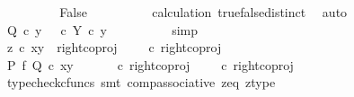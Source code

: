 \begin{isabellebody}
\ \ \ \ \ \ \isamarkupfalse%
\ \isamarkupfalse%
\ False\isanewline
\ \ \ \ \ \ \ \ \isamarkupfalse%
\ calculation\ true{\isacharunderscore}{\kern0pt}false{\isacharunderscore}{\kern0pt}distinct\ \isamarkupfalse%
\ auto\isanewline
\ \ \ \ \ \ \isamarkupfalse%
\ \isamarkupfalse%
\ {\isachardoublequoteopen}Q\ {\isasymcirc}\isactrlsub c\ y\ {\isacharequal}{\kern0pt}\ {\isacharparenleft}{\kern0pt}{\isasymt}\ {\isasymcirc}\isactrlsub c\ {\isasymbeta}\isactrlbsub Y\isactrlesub {\isacharparenright}{\kern0pt}\ {\isasymcirc}\isactrlsub c\ y{\isachardoublequoteclose}\isanewline
\ \ \ \ \ \ \ \ \isamarkupfalse%
\ simp\isanewline
\ \ \ \ \isamarkupfalse%
\isanewline
\ \ \ \ \ \ \isamarkupfalse%
\ {\isachardoublequoteopen}z\ {\isasymcirc}\isactrlsub c\ {\isasymlangle}x{\isacharcomma}{\kern0pt}y{\isasymrangle}\ {\isacharequal}{\kern0pt}\ right{\isacharunderscore}{\kern0pt}coproj\ {\isasymone}\ {\isacharparenleft}{\kern0pt}{\isasymone}\ {\isasymCoprod}\ {\isasymone}{\isacharparenright}{\kern0pt}\ {\isasymcirc}\isactrlsub c\ right{\isacharunderscore}{\kern0pt}coproj\ {\isasymone}\ {\isasymone}{\isachardoublequoteclose}\isanewline
\ \ \ \ \ \ \isamarkupfalse%
\ \isamarkupfalse%
\ {\isachardoublequoteopen}{\isacharparenleft}{\kern0pt}P\ {\isasymtimes}\isactrlsub f\ Q{\isacharparenright}{\kern0pt}\ {\isasymcirc}\isactrlsub c\ {\isasymlangle}x{\isacharcomma}{\kern0pt}y{\isasymrangle}\ {\isacharequal}{\kern0pt}\ {\isacharparenleft}{\kern0pt}{\isasymlangle}{\isasymt}{\isacharcomma}{\kern0pt}{\isasymt}{\isasymrangle}\ {\isasymamalg}\ {\isasymlangle}{\isasymf}{\isacharcomma}{\kern0pt}{\isasymf}{\isasymrangle}\ {\isasymamalg}\ {\isasymlangle}{\isasymf}{\isacharcomma}{\kern0pt}{\isasymt}{\isasymrangle}{\isacharparenright}{\kern0pt}\ {\isasymcirc}\isactrlsub c\ right{\isacharunderscore}{\kern0pt}coproj\ {\isasymone}\ {\isacharparenleft}{\kern0pt}{\isasymone}\ {\isasymCoprod}\ {\isasymone}{\isacharparenright}{\kern0pt}\ {\isasymcirc}\isactrlsub c\ right{\isacharunderscore}{\kern0pt}coproj\ {\isasymone}\ {\isasymone}{\isachardoublequoteclose}\isanewline
\ \ \ \ \ \ \ \ \isamarkupfalse%
\ {\isacharparenleft}{\kern0pt}typecheck{\isacharunderscore}{\kern0pt}cfuncs{\isacharcomma}{\kern0pt}\ smt\ comp{\isacharunderscore}{\kern0pt}associative{}\ z{\isacharunderscore}{\kern0pt}eq\ z{\isacharunderscore}{\kern0pt}type{\isacharparenright}{\kern0pt}\isanewline
\ \ \ \ \ \ \isamarkupfalse%

\end{isabellebody}
